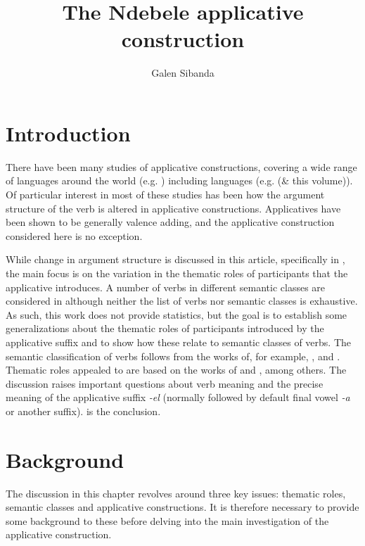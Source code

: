 \documentclass[output=paper]{langsci/langscibook}
\title{The Ndebele applicative construction}
\author{%
 Galen Sibanda \affiliation{Michigan State University} 
}
\begin{document}
\section{Introduction}\label{sec:sibanda:1}

There have been many studies of applicative constructions, covering a wide range of languages around the world (e.g. \citealt{Peterson2007}) including  languages (e.g. \citealt{Ngonyani1996,Mabugu2011,Jerro2016} (\& this volume)). Of particular interest in most of these studies has been how the argument structure of the verb is altered in applicative constructions. Applicatives have been shown to be generally valence adding, and the  applicative construction considered here is no exception. 

 While change in  argument structure is discussed in this article, specifically in , the main focus is on the variation in the thematic roles of participants that the applicative introduces. A number of verbs in different semantic classes are considered in  although neither the list of verbs nor semantic classes is exhaustive. As such, this work does not provide statistics, but the goal is to establish some generalizations about the thematic roles of participants introduced by the applicative suffix and to show how these relate to semantic classes of verbs. The semantic classification of verbs follows from the works of, for example, \citet{Chafe1970,Dowty1987,Dowty1991,FoleyVanValin1984}, and \citet{Payne1997}. Thematic roles appealed to are based on the works of \citet{Frawley1992,Fillmore1968,Fillmore1977} and \citet{Halliday1970}, among others. The discussion raises important questions about verb meaning and the precise meaning of the applicative suffix \textit{-el} (normally followed by default final vowel \textit{-a} or another suffix).  is the conclusion.

\section{Background}\label{sec:sibanda:2}

The discussion in this chapter revolves around three key issues: thematic roles, semantic classes and applicative constructions. It is therefore necessary to provide some background to these before delving into the main investigation of the  applicative construction. 
\end{document}
